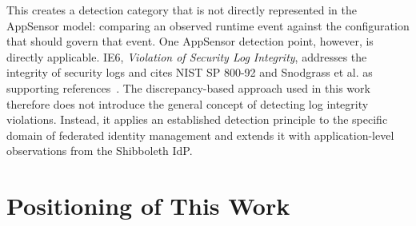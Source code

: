 \documentclass[../main.tex]{subfiles}
\begin{document}
This creates a detection category that is not directly represented in the AppSensor model: 
comparing an observed runtime event against the configuration that should govern that event.
One AppSensor detection point, however, is directly applicable. 
IE6, \textit{Violation of Security Log Integrity}, addresses the integrity of 
security logs and cites NIST SP 800-92 and Snodgrass et al. as supporting 
references~\cite{OWASPAppSensor, NIST80092, TamperDetection}. 
The discrepancy-based approach used in this work therefore does not introduce the general concept 
of detecting log integrity violations. 
Instead, it applies an established detection principle to the specific domain of federated 
identity management and extends it with application-level observations from the Shibboleth IdP. 

\section{Positioning of This Work}\label{sec:positioning}
\end{document}
